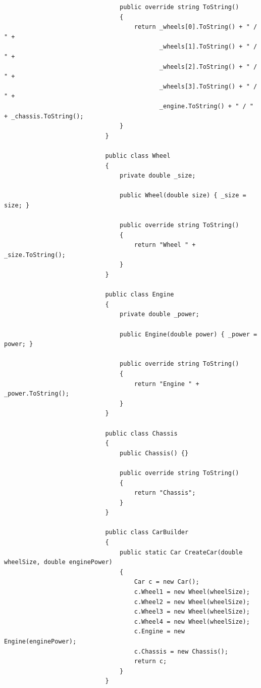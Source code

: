 \documentclass[a4paper,10pt]{article}
\begin{document}
\begin{lstlisting}
                                public override string ToString()
                                {
                                    return _wheels[0].ToString() + " / " +
                                           _wheels[1].ToString() + " / " +
                                           _wheels[2].ToString() + " / " +
                                           _wheels[3].ToString() + " / " +
                                           _engine.ToString() + " / " + _chassis.ToString();
                                }
                            }
                        
                            public class Wheel
                            {
                                private double _size;
                        
                                public Wheel(double size) { _size = size; }
                        
                                public override string ToString()
                                {
                                    return "Wheel " + _size.ToString();
                                }
                            }
                        
                            public class Engine
                            {
                                private double _power;
                        
                                public Engine(double power) { _power = power; }
                        
                                public override string ToString()
                                {
                                    return "Engine " + _power.ToString();
                                }
                            }
                        
                            public class Chassis
                            {
                                public Chassis() {}
                        
                                public override string ToString()
                                {
                                    return "Chassis";
                                }
                            }
                        
                            public class CarBuilder
                            {
                                public static Car CreateCar(double wheelSize, double enginePower)
                                {
                                    Car c = new Car();
                                    c.Wheel1 = new Wheel(wheelSize);
                                    c.Wheel2 = new Wheel(wheelSize);
                                    c.Wheel3 = new Wheel(wheelSize);
                                    c.Wheel4 = new Wheel(wheelSize);
                                    c.Engine = new Engine(enginePower);
                                    c.Chassis = new Chassis();
                                    return c;
                                }
                            }
                        

\end{lstlisting}
\end{document}
